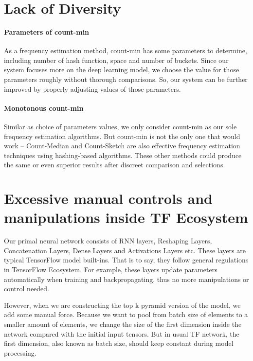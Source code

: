 \section{Lack of Diversity}

\paragraph{Parameters of count-min}
As a frequency estimation method, count-min has some parameters to determine, including number of hash function, space and number of buckets. Since our system focuses more on the deep learning model, we choose the value for those parameters roughly without thorough comparisons. So, our system can be further improved by properly adjusting values of those parameters.

\paragraph{Monotonous count-min}
Similar as choice of parameters values, we only consider count-min as our sole frequency estimation algorithms. But count-min is not the only one that would work -- Count-Median and Count-Sketch are also effective frequency estimation techniques using hashing-based algorithms. These other methods could produce the same or even superior results after discreet comparison and selections. 

\section{Excessive manual controls and manipulations inside TF Ecosystem}

Our primal neural network consists of RNN layers, Reshaping Layers, Concatenation Layers, Dense Layers and Activations Layers etc. These layers are typical TensorFlow model built-ins. That is to say, they follow general regulations in TensorFlow Ecosystem. For example, these layers update parameters automatically when training and backpropagating, thus no more manipulations or control needed.

However, when we are constructing the top k pyramid version of the model, we add some manual force. Because we want to pool from batch size of elements to a smaller amount of elements, we change the size of the first dimension inside the network compared with the initial input tensors. But in usual TF network, the first dimension, also known as batch size, should keep constant during model processing. 

